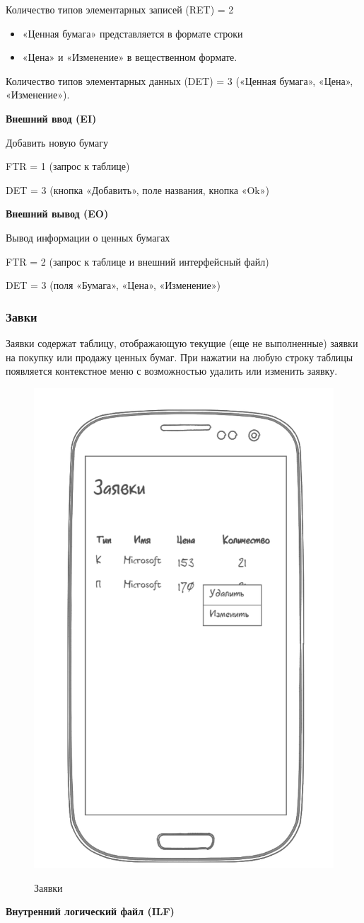 Количество типов элементарных записей (RET) = 2

\begin{itemize}
	\item «Ценная бумага» представляется в формате строки
	\item «Цена» и «Изменение» в вещественном формате.
\end{itemize}



Количество типов элементарных данных (DET) = 3 («Ценная бумага», «Цена», «Изменение»).

\textbf{Внешний ввод (EI)}

Добавить новую бумагу

FTR = 1 (запрос к таблице)

DET = 3 (кнопка «Добавить», поле названия, кнопка «Ok»)

\textbf{Внешний вывод (EO)}

Вывод информации о ценных бумагах

FTR = 2 (запрос к таблице и внешний интерфейсный файл)

DET = 3 (поля «Бумага», «Цена», «Изменение»)


\subsubsection{Завки}

Заявки содержат таблицу, отображающую текущие (еще не выполненные) заявки на покупку или продажу ценных бумаг. 
При нажатии на любую строку таблицы появляется контекстное меню с возможностью удалить или изменить заявку.

\begin{figure}[ht!]
	\includegraphics[width=0.3\linewidth]{assets/images/1.3 Заявка.png}
	\label{fig:r2}
	\caption{Заявки}
\end{figure}
\FloatBarrier

\textbf{Внутренний логический файл (ILF)}

